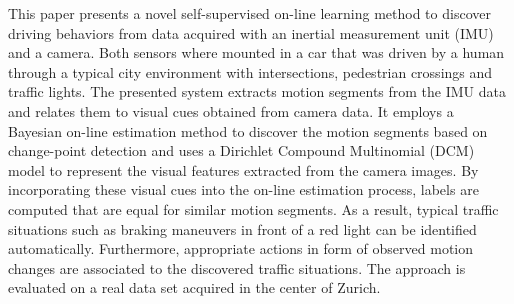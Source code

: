 This paper presents a novel self-supervised on-line learning method to
discover driving behaviors from data acquired with an inertial
measurement unit (IMU) and a camera. Both sensors where mounted in a
car that was driven by a human through a typical city environment with
intersections, pedestrian crossings and traffic lights. The presented
system extracts motion segments from the IMU data and relates them to
visual cues obtained from  camera data. It employs a Bayesian
on-line estimation method to discover the motion segments based on
change-point detection and uses a Dirichlet Compound Multinomial (DCM)
model to represent the visual features extracted from the camera
images. By incorporating these visual cues into the on-line estimation
process, labels are computed that are equal for similar motion
segments. As a result, typical traffic situations such as braking
maneuvers in front of a red light can be identified
automatically. Furthermore, appropriate actions in form of observed
motion changes are associated to the discovered traffic
situations. The approach is evaluated on a real data set acquired in
the center of Zurich.
